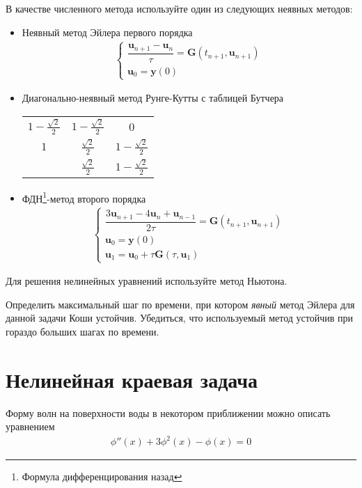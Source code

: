 \documentclass[10pt]{article}
\begin{document}
В качестве численного метода используйте один из следующих неявных методов:
\begin{itemize}
\item Неявный метод Эйлера первого порядка
\begin{gather*}
\begin{cases}
\dfrac{\mathbf{u}_{n+1} - \mathbf{u}_{n}}{\tau} = \mathbf{G}(t_{n+1},
\mathbf{u}_{n+1})\\
\mathbf{u}_0 = \mathbf{y}(0)
\end{cases}
\end{gather*}
\item Диагонально-неявный метод Рунге-Кутты с таблицей Бутчера
\begin{center}
\begin{tabular}{c|cc}
$1 - \frac{\sqrt{2}}{2}$ & $1 - \frac{\sqrt{2}}{2}$ & 0\\
$1$ & $\frac{\sqrt{2}}{2}$ & $1 - \frac{\sqrt{2}}{2}$ \\
\hline
& $\frac{\sqrt{2}}{2}$ & $1 - \frac{\sqrt{2}}{2}$
\end{tabular}
\end{center}
\item ФДН\footnote{Формула дифференцирования назад}-метод второго порядка
\begin{gather*}
\begin{cases}
\dfrac{3\mathbf{u}_{n+1} - 4\mathbf{u}_{n} + \mathbf{u}_{n-1}}{2\tau} = \mathbf{G}(t_{n+1},
\mathbf{u}_{n+1})\\
\mathbf{u}_0 = \mathbf{y}(0)\\
\mathbf{u}_1 = \mathbf{u}_0 + \tau \mathbf{G}(\tau, \mathbf{u}_1)
\end{cases}
\end{gather*}
\end{itemize}

Для решения нелинейных уравнений используйте метод Ньютона.

Определить максимальный шаг по времени, при котором \emph{явный} метод Эйлера
для данной задачи Коши устойчив. Убедиться, что используемый метод устойчив при
гораздо больших шагах по времени.

\section{Нелинейная краевая задача}
Форму волн на поверхности воды в некотором приближении можно описать 
уравнением
\begin{gather*}
\phi''(x) + 3 \phi^2(x) - \phi(x) = 0
\end{gather*}
\end{document}
